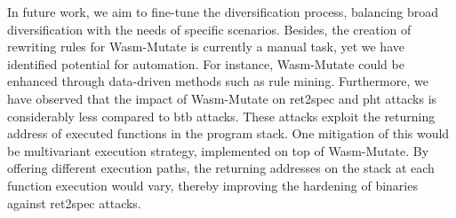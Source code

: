 \documentclass[a4paper,fleqn]{cas-dc}
\newcommand{\tool}{{\sc Wasm-Mutate}\xspace}
\begin{document}
In future work, we aim to fine-tune the diversification process, balancing broad diversification with the needs of specific scenarios. 
Besides, the creation of rewriting rules for \tool is currently a manual task, yet we have identified potential for automation. 
For instance, \tool could be enhanced through data-driven methods such as rule mining.
Furthermore, we have observed that the impact of \tool on ret2spec and pht attacks is considerably less compared to btb attacks. 
These attacks exploit the returning address of executed functions in the program stack. 
One mitigation of this would be multivariant execution strategy, implemented on top of \tool. By offering different execution paths, the returning addresses on the stack at each function execution would vary, thereby improving the hardening of binaries against ret2spec attacks.








\balance
\end{document}
